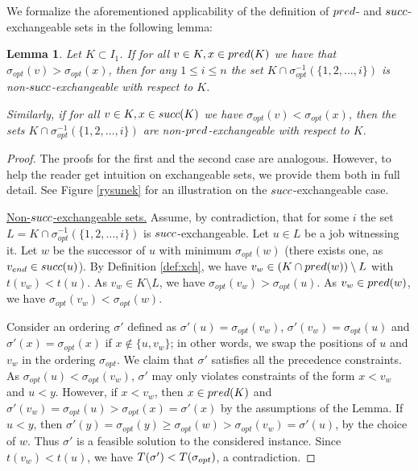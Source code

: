 \documentclass{article}
\newtheorem{lemma}[theorem]{Lemma}
\theoremstyle{definition}
\begin{document}
We formalize the aforementioned applicability of the definition of ${pred}$- and ${succ}$-exchangeable sets in the following lemma:
\begin{lemma}\label{lem:exchange}
Let $K \subset I_1$.
If for all $v \in K, x \in {\ensuremath{pred}}(K)$ we have that $\sigma_{opt}(v) > \sigma_{opt}(x)$, then for any $1 \leq i \leq n$ the set $K \cap \sigma_{opt}^{-1}(\{1, 2,\ldots, i\})$
is non-${succ}$-exchangeable with respect to $K$.

Similarly, if for all $v \in K, x \in {\ensuremath{succ}}(K)$ we have $\sigma_{opt}(v) < \sigma_{opt}(x)$,
then the sets $K \cap \sigma_{opt}^{-1}(\{1, 2,\ldots, i\})$ are non-${pred}$-exchangeable with respect to $K$.
\end{lemma}

\begin{proof}
The proofs for the first and the second case are analogous. However, to help the reader get intuition on exchangeable sets, we provide them both in full detail.
See Figure \ref{rysunek} for an illustration on the ${succ}$-exchangeable case.

{\underline{Non-${succ}$-exchangeable sets.}} Assume, by contradiction, that for some $i$ the set $L = K \cap \sigma_{opt}^{-1}(\{1,2,\ldots,i\})$ is ${succ}$-exchangeable.
Let $u \in L$ be a job witnessing it. Let $w$ be the successor of $u$ with minimum $\sigma_{opt}(w)$ (there exists one, as $v_{end} \in {\ensuremath{succ}}(u)$). 
By Definition \ref{def:xch}, we have $v_w \in (K \cap {\ensuremath{pred}}(w)) \setminus L$ with $t(v_w) < t(u)$.
As $v_w \in K \setminus L$, we have $\sigma_{opt}(v_w) > \sigma_{opt}(u)$. As $v_w \in {\ensuremath{pred}}(w)$, we have $\sigma_{opt}(v_w) < \sigma_{opt}(w)$.

Consider an ordering $\sigma'$ defined as $\sigma'(u) = \sigma_{opt}(v_w)$, $\sigma'(v_w) = \sigma_{opt}(u)$ and $\sigma'(x) = \sigma_{opt}(x)$ if $x \notin \{u,v_w\}$;
in other words, we swap the positions of $u$ and $v_w$ in the ordering $\sigma_{opt}$. We claim that $\sigma'$ satisfies all the precedence constraints.
As $\sigma_{opt}(u) < \sigma_{opt}(v_w)$, $\sigma'$ may only violates constraints of the form $x < v_w$ and $u < y$. However, if $x < v_w$, then $x \in {\ensuremath{pred}}(K)$
and $\sigma'(v_w) = \sigma_{opt}(u) > \sigma_{opt}(x) = \sigma'(x)$ by the assumptions of the Lemma.
If $u < y$, then $\sigma'(y) = \sigma_{opt}(y) \geq \sigma_{opt}(w) > \sigma_{opt}(v_w) = \sigma'(u)$, by the choice of $w$.
Thus $\sigma'$ is a feasible solution to the considered \schedname{} instance. Since $t(v_w) < t(u)$, we have $T(\sigma') < T(\sigma_{opt})$, a contradiction.


\end{proof}
\end{document}
